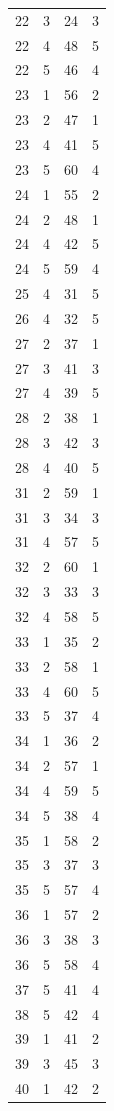 \documentclass[a4paper, amsfonts, amssymb, amsmath, reprint, showkeys, nofootinbib, twoside]{revtex4-1}
\begin{document}
\begin{longtable}[h!]{ cccc }
	22 & 3 & 24 & 3 \\
	22 & 4 & 48 & 5 \\
	22 & 5 & 46 & 4 \\
	23 & 1 & 56 & 2 \\
	23 & 2 & 47 & 1 \\
	23 & 4 & 41 & 5 \\
	23 & 5 & 60 & 4 \\
	24 & 1 & 55 & 2 \\
	24 & 2 & 48 & 1 \\
	24 & 4 & 42 & 5 \\
	24 & 5 & 59 & 4 \\
	25 & 4 & 31 & 5 \\
	26 & 4 & 32 & 5 \\
	27 & 2 & 37 & 1 \\
	27 & 3 & 41 & 3 \\
	27 & 4 & 39 & 5 \\
	28 & 2 & 38 & 1 \\
	28 & 3 & 42 & 3 \\
	28 & 4 & 40 & 5 \\
	31 & 2 & 59 & 1 \\
	31 & 3 & 34 & 3 \\
	31 & 4 & 57 & 5 \\
	32 & 2 & 60 & 1 \\
	32 & 3 & 33 & 3 \\
	32 & 4 & 58 & 5 \\
	33 & 1 & 35 & 2 \\
	33 & 2 & 58 & 1 \\
	33 & 4 & 60 & 5 \\
	33 & 5 & 37 & 4 \\
	34 & 1 & 36 & 2 \\
	34 & 2 & 57 & 1 \\
	34 & 4 & 59 & 5 \\
	34 & 5 & 38 & 4 \\
	35 & 1 & 58 & 2 \\
	35 & 3 & 37 & 3 \\
	35 & 5 & 57 & 4 \\
	36 & 1 & 57 & 2 \\
	36 & 3 & 38 & 3 \\
	36 & 5 & 58 & 4 \\
	37 & 5 & 41 & 4 \\
	38 & 5 & 42 & 4 \\
	39 & 1 & 41 & 2 \\
	39 & 3 & 45 & 3 \\
	40 & 1 & 42 & 2 \\

\end{longtable}
\end{document}
